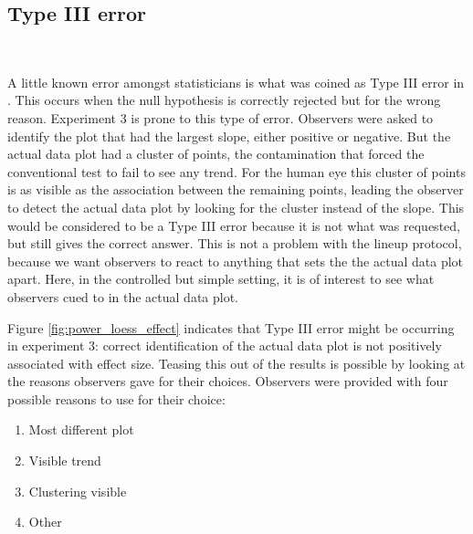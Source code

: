 \documentclass[12pt]{article}
\begin{document}
\subsection{Type III error}~\label{sec:TypeIII}


A little known error amongst statisticians is what was coined as Type III error in \citet{mosteller:48}. This occurs when the null hypothesis is correctly rejected but for the wrong reason. Experiment 3 is prone to this type of error. Observers were asked to identify the plot that had the largest slope, either positive or negative. But the actual data plot had a cluster of points, the contamination that forced the conventional test to fail to see any trend. For the human eye this cluster of points is  as visible as the association between the remaining points, leading the observer to detect the actual data plot by looking for the cluster instead of the slope. This would be considered to be a Type III error because it is not what was requested, but  still gives the correct answer. This is not a problem with the lineup protocol, because we want observers to react to anything that sets the the actual data plot apart. Here, in the controlled but simple setting, it is of interest to see what observers cued to in the actual data plot. 

Figure \ref{fig:power_loess_effect} indicates that Type III error might be occurring in experiment 3: correct identification of the actual data plot is not positively associated with effect size. Teasing this out of the results is possible by looking at the reasons observers gave for their choices. Observers were provided with four possible reasons to use for their choice:


\begin{enumerate} \itemsep 0in
\item Most different plot
\item Visible trend
\item Clustering visible
\item Other
\end{enumerate}
\end{document}
